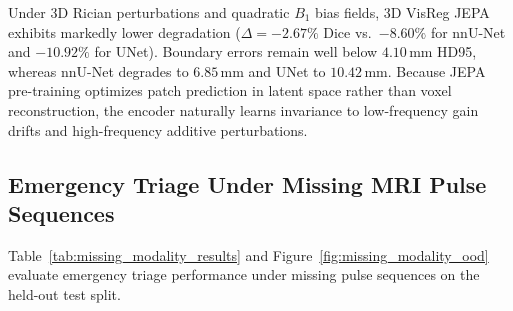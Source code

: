\documentclass{article}
\begin{document}
Under 3D Rician perturbations and quadratic $B_1$ bias fields, 3D VisReg JEPA exhibits markedly lower degradation ($\Delta = -2.67\%$ Dice vs.\ $-8.60\%$ for nnU-Net and $-10.92\%$ for UNet). Boundary errors remain well below $4.10\,\text{mm}$ HD95, whereas nnU-Net degrades to $6.85\,\text{mm}$ and UNet to $10.42\,\text{mm}$. Because JEPA pre-training optimizes patch prediction in latent space rather than voxel reconstruction, the encoder naturally learns invariance to low-frequency gain drifts and high-frequency additive perturbations.

\subsection{Emergency Triage Under Missing MRI Pulse Sequences}
\label{sec:results_missing_modality}

Table~\ref{tab:missing_modality_results} and Figure~\ref{fig:missing_modality_ood} evaluate emergency triage performance under missing pulse sequences on the held-out test split.
\end{document}

